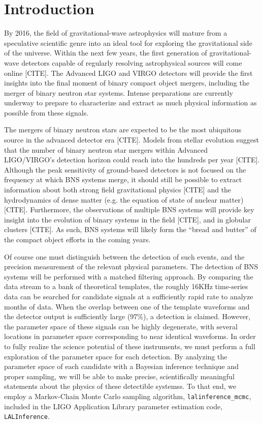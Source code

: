 \documentclass[11pt,a4paper]{emulateapj}
\newcommand{\carl}[1]{{\color{red}  #1}}
\begin{document}
\section{Introduction}

 By 2016, the field of gravitational-wave astrophysics will
 mature from a speculative scientific genre into an ideal tool for 
 exploring the gravitational side of the universe. Within the next few
 years, the first generation of gravitational-wave detectors capable 
 of regularly resolving astrophysical sources will come online \carl{[CITE]}.
 The Advanced LIGO and VIRGO detectors will provide the first insights
 into the final moment of binary compact object mergers, including the 
 merger of binary neutron star systems.  Intense preparations are currently
 underway to prepare to characterize and extract as much physical 
 information as possible from these signals.
 
The mergers of binary neutron stars are expected to be the most ubiquitous
source in the advanced detector era \carl{[CITE]}.   Models from stellar 
evolution suggest that the number of binary neutron star mergers within 
Advanced LIGO/VIRGO's detection horizon could reach into the hundreds per 
year \carl{[CITE]}.  Although the peak sensitivity of ground-based detectors
is not focused on the frequency at which BNS systems merge, it should still
be possible to extract information about both strong field gravitational 
physics \carl{[CITE]} and the hydrodynamics of dense matter (e.g. the equation 
of state of nuclear matter) \carl{[CITE]}.  Furthermore, the observations of multiple BNS
systems will provide key insight into the evolution of binary systems in the field \carl{[CITE]},
and in globular clusters \carl{[CITE]}. As such, BNS systems will likely 
form the ``bread and butter'' of the compact object efforts in the coming 
years.


Of course one must distinguish between the detection of 
such events, and the precision measurement of the relevant physical parameters.
The detection of BNS systems will be performed with a matched filtering approach.  
By comparing the data stream to a bank of theoretical templates, the roughly 16KHz
 time-series data can be searched for candidate signals at a sufficiently
  rapid rate to analyze months of data.  When the overlap between one of the template waveforms and the 
detector output is sufficiently large (97\%), a detection is claimed.  However,
the parameter space of these signals can be highly degenerate, with several 
locations in parameter space corresponding to near identical waveforms.  In 
order to fully realize the science potential of these instruments, we must 
perform a full exploration of the parameter space for each detection.  By 
analyzing the parameter space of each candidate with a Bayesian inference technique 
and proper sampling, we will be able to make precise, scientifically meaningful
statements about the physics of these detectible systemss.  To 
that end, we employ a Markov-Chain Monte Carlo sampling algorithm, 
\texttt{lalinference\_mcmc}, included in the LIGO Application Library parameter
estimation code, \texttt{LALInference}.  
\end{document}

